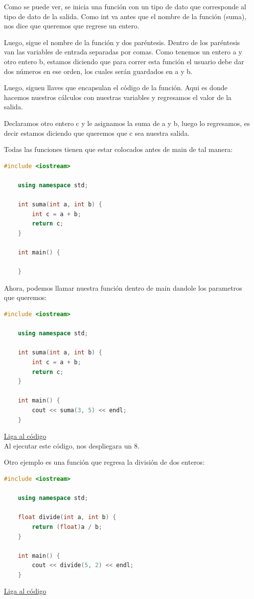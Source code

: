 \documentclass{article}
\begin{document}
Como se puede ver, se inicia una función con un tipo de dato que corresponde al tipo de dato de la salida. Como int va antes que el nombre de la función (suma), nos dice que queremos que regrese un entero.

Luego, sigue el nombre de la función y dos paréntesis. Dentro de los paréntesis van las variables de entrada separadas por comas. Como tenemos un entero a y otro entero b, estamos diciendo que para correr esta función el usuario debe dar dos números en ese orden, los cuales serán guardados en a y b.

Luego, siguen llaves que encapsulan el código de la función. Aqui es donde hacemos nuestros cálculos con nuestras variables y regresamos el valor de la salida.

Declaramos otro entero c y le asignamos la suma de a y b, luego lo regresamos, es decir estamos diciendo que queremos que c sea nuestra salida.

Todas las funciones tienen que estar colocados antes de main de tal manera:

\begin{lstlisting}[language=C++, caption=Función de suma]
    #include <iostream>

    using namespace std;
    
    int suma(int a, int b) {
        int c = a + b;
        return c;
    }

    int main() {

    }
\end{lstlisting}

Ahora, podemos llamar nuestra función dentro de main dandole los parametros que queremos:

\begin{lstlisting}[language=C++, caption=Función de suma]
    #include <iostream>

    using namespace std;
    
    int suma(int a, int b) {
        int c = a + b;
        return c;
    }

    int main() {
        cout << suma(3, 5) << endl;
    }
\end{lstlisting}
\href{https://repl.it/@Jamesscn/Funciones}{Liga al código}\\

Al ejecutar este código, nos despliegara un 8.

Otro ejemplo es una función que regresa la división de dos enteros:

\begin{lstlisting}[language=C++, caption=Función de división]
    #include <iostream>

    using namespace std;
    
    float divide(int a, int b) {
        return (float)a / b;
    }

    int main() {
        cout << divide(5, 2) << endl;
    }
\end{lstlisting}
\href{https://repl.it/@Jamesscn/Funciones}{Liga al código}\\
\end{document}
